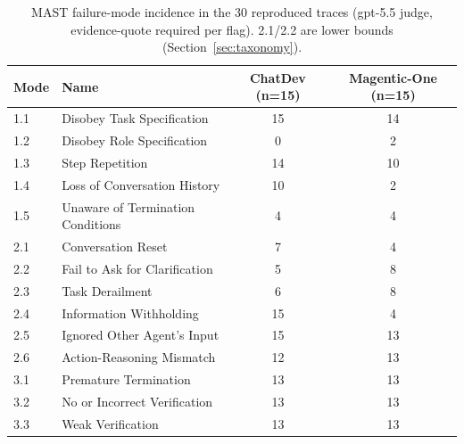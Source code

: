 \begin{table}[h]\centering\small
\begin{tabular}{llcc}\toprule
Mode & Name & ChatDev (n=15) & Magentic-One (n=15)\\
\midrule
1.1 & Disobey Task Specification & 15 & 14\\
1.2 & Disobey Role Specification & 0 & 2\\
1.3 & Step Repetition & 14 & 10\\
1.4 & Loss of Conversation History & 10 & 2\\
1.5 & Unaware of Termination Conditions & 4 & 4\\
2.1 & Conversation Reset & 7 & 4\\
2.2 & Fail to Ask for Clarification & 5 & 8\\
2.3 & Task Derailment & 6 & 8\\
2.4 & Information Withholding & 15 & 4\\
2.5 & Ignored Other Agent's Input & 15 & 13\\
2.6 & Action-Reasoning Mismatch & 12 & 13\\
3.1 & Premature Termination & 13 & 13\\
3.2 & No or Incorrect Verification & 13 & 13\\
3.3 & Weak Verification & 13 & 13\\
\bottomrule\end{tabular}
\caption{MAST failure-mode incidence in the 30 reproduced traces (gpt-5.5 judge, evidence-quote required per flag). 2.1/2.2 are lower bounds (Section~\ref{sec:taxonomy}).}\label{tab:modes}
\end{table}
